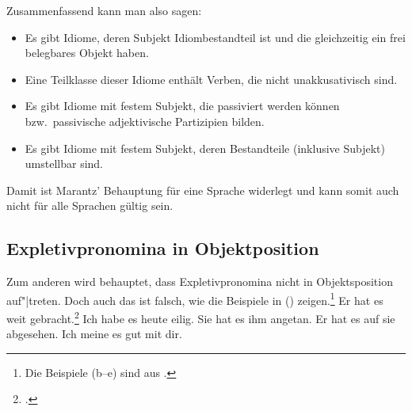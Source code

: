 Zusammenfassend kann man also sagen:
\begin{itemize}
\item Es gibt Idiome, deren Subjekt Idiombestandteil ist und die gleichzeitig ein frei belegbares Objekt haben.
\item Eine Teilklasse dieser Idiome enthält Verben, die nicht unakkusativisch sind.
\item Es gibt Idiome mit festem Subjekt, die passiviert werden können bzw.\ passivische adjektivische Partizipien bilden.
\item Es gibt Idiome mit festem Subjekt, deren Bestandteile (inklusive Subjekt) umstellbar sind.
\end{itemize}
Damit ist Marantz' Behauptung für eine Sprache widerlegt und kann somit auch nicht für alle Sprachen gültig sein.

\subsection{Expletivpronomina in Objektposition}
\label{sec-expletivum-in-obj-position}

%
Zum anderen wird behauptet, dass Expletivpronomina nicht in Objektsposition auf"|treten.
Doch auch das
ist falsch, wie die Beispiele in () zeigen.\footnote{
  Die Beispiele (b--e) sind aus .
}
\eal
\ex Er hat es weit gebracht.\footnote{
        .
}
\ex Ich habe es heute eilig.
\ex Sie hat es ihm angetan.
\ex Er hat es auf sie abgesehen.
\ex Ich meine es gut mit dir.
\zl


